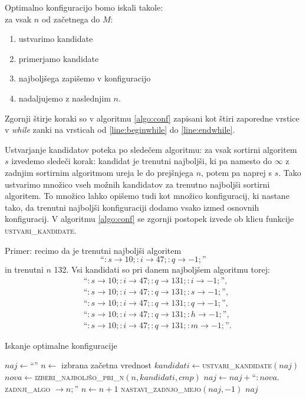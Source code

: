 \documentclass[a4paper,oneside,12pt]{article}
\newcommand{\lra}{\ensuremath{\longrightarrow}}
\begin{document}
Optimalno konfiguracijo bomo iskali takole: \\
za vsak $n$ od začetnega do $M$:
\begin{enumerate}[1.)]
  \item ustvarimo kandidate
  \item primerjamo kandidate
  \item najboljšega zapišemo v konfiguracijo
  \item nadaljujemo z naslednjim $n$.
\end{enumerate}

Zgornji štirje koraki so v algoritmu \ref{algo:conf} zapisani kot štiri zaporedne vrstice v
\emph{while} zanki na vrsticah od \ref{line:beginwhile} do \ref{line:endwhile}.

Ustvarjanje kandidatov poteka po sledečem algoritmu: za vsak sortirni algoritem $s$
izvedemo sledeči korak:
kandidat je trenutni najboljši, ki pa namesto do $\infty$ z zadnjim sortirnim
algoritmom ureja le do prejšnjega $n$, potem pa naprej s $s$. Tako ustvarimo množico
vseh možnih kandidatov za trenutno najboljši sortirni algoritem.
To množico lahko opišemo tudi kot množico konfiguracij, ki nastane tako, da trenutni
najboljši konfiguraciji dodamo vsako izmed osnovnih konfiguracij.
V algoritmu \ref{algo:conf} se
zgornji postopek izvede ob klicu funkcije \textsc{ustvari\_kandidate}.

Primer: recimo da je trenutni najboljši algoritem 
\[ \mbox{``$:s \lra 10;:i \lra 47;:q \lra -1;$''} \] in trenutni $n$ 132.
Vsi kandidati so pri danem najboljšem algoritmu torej:
\begin{align*}
   \ & \mbox{``$:s \lra 10;:i \lra 47;:q \lra 131;:i \lra -1;$''}, \\ 
   \ & \mbox{``$:s \lra 10;:i \lra 47;:q \lra 131;:s \lra -1;$''}, \\
   \ & \mbox{``$:s \lra 10;:i \lra 47;:q \lra 131;:q \lra -1;$''}, \\
   \ & \mbox{``$:s \lra 10;:i \lra 47;:q \lra 131;:h \lra -1;$''}, \\
   \ & \mbox{``$:s \lra 10;:i \lra 47;:q \lra 131;:m \lra -1;$''}. 
\end{align*}

\begin{algorithm}
  \caption{Iskanje optimalne konfiguracije}\label{algo:conf}
  \begin{algorithmic}[1]
    \State \label{line:confinit}$naj \gets $``''
    \State $n \gets $ izbrana začetna vrednost
     \label{line:beginwhile}
        \State \label{line:kanddati} $kandidati \gets $\textsc{ustvari\_kandidate}$(naj)$
        \State \label{line:bestatn} $nova \gets $\textsc{izberi\_najboljšo\_pri\_n}$(n, kandidati, cmp)$
        \State \label{line:addconf} $naj \gets naj + $``$:nova.$\textsc{zadnji\_algo} $\lra n;$''
        \State \label{line:n++} $n \gets n + 1$
    \EndWhile \label{line:endwhile}
    \State \textsc{nastavi\_zadnjo\_mejo}$(naj, -1)$
    \State \Return $naj$
  \end{algorithmic}
\end{algorithm}
\end{document}
